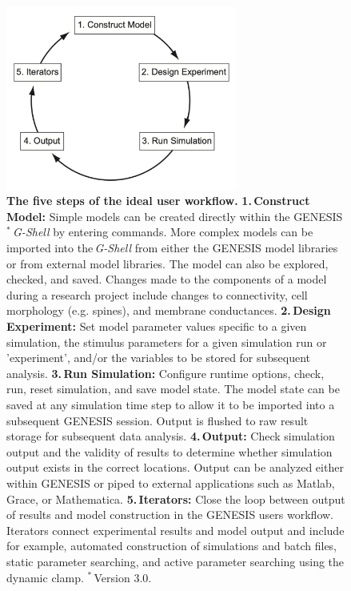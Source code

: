 \documentclass{article}
\begin{document}
\begin{figure}[h!t]
  \begin{center}
    \includegraphics[width=3in]{figures/user-workflow.pdf}
  \end{center}
  \caption{ \small{{\bf The five steps of the ideal user workflow.} {\textbf{1.\,Construct Model:} Simple models can be created directly within the GENESIS$^*$\,\textit{G-Shell} by entering commands. More complex models can be imported into the\,\textit{G-Shell} from either the GENESIS model libraries or from external model libraries. The model can also be explored, checked, and saved. Changes made to the components of a model during a research project include changes to connectivity, cell morphology (e.g. spines), and membrane conductances. \textbf{2.\,Design Experiment:} Set model parameter values specific to a given simulation, the stimulus parameters for a given simulation run or 'experiment', and/or the variables to be stored for subsequent analysis.} \textbf{3.\,Run Simulation:} Configure runtime options, check, run, reset simulation, and save model state. The model state can be saved at any simulation time step to allow it to be imported into a subsequent GENESIS session. Output is flushed to raw result storage for subsequent data analysis. \textbf{4.\,Output:} Check simulation output and the validity of results to determine whether simulation output exists in the correct locations. Output can be analyzed either within GENESIS or piped to external applications such as Matlab, Grace, or Mathematica. \textbf{5.\,Iterators:} Close the loop between output of results and model construction in the GENESIS users workflow. Iterators connect experimental results and model output and include for example, automated construction of simulations and batch files, static parameter searching, and active parameter searching using the dynamic clamp. $^*$\,Version 3.0.}}
  \label{fig:user-workflow}
\end{figure}
\end{document}
